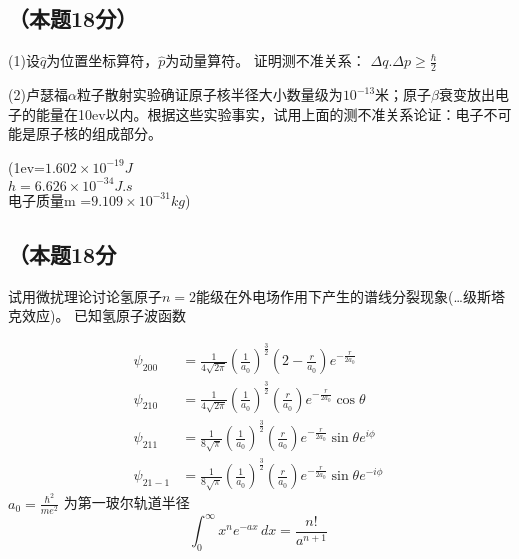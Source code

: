 \subsection{（本题18分）}
(1)设$\hat q$为位置坐标算符，$\hat p$为动量算符。
证明测不准关系：
$\Delta q.\Delta p\ge \frac{\hbar}{2}$

(2)卢瑟福$\alpha$粒子散射实验确证原子核半径大小数量级为$10^{-13}$米；原子$\beta$衰变放出电子的能量在10ev以内。根据这些实验事实，试用上面的测不准关系论证：电子不可能是原子核的组成部分。

(1ev=$1.602\times10^{-19}J$\\
$h=6.626\times10^{-34}J.s$\\
电子质量m =$9.109\times {10^{-31}kg}$)

\subsection{（本题18分}
试用微扰理论讨论氢原子$n=2$能级在外电场作用下产生的谱线分裂现象(…级斯塔克效应)。
已知氢原子波函数

\begin{equation}
\begin{aligned}
\psi_{200} &= \frac{1}{4\sqrt{2\pi}} \left( \frac{1}{a_0} \right)^{\frac{3}{2}} (2 - \frac{r}{a_0}) e^{-\frac{r}{2a_0}} \\
\psi_{210} &= \frac{1}{4\sqrt{2\pi}} \left( \frac{1}{a_0} \right)^{\frac{3}{2}} \left( \frac{r}{a_0} \right) e^{-\frac{r}{2a_0}} \cos \theta \\
\psi_{211} &= \frac{1}{8\sqrt{\pi}} \left( \frac{1}{a_0} \right)^{\frac{3}{2}} \left( \frac{r}{a_0} \right) e^{-\frac{r}{2a_0}} \sin \theta e^{i\phi} \\
\psi_{21-1} &= \frac{1}{8\sqrt{\pi}} \left( \frac{1}{a_0} \right)^{\frac{3}{2}} \left( \frac{r}{a_0} \right) e^{-\frac{r}{2a_0}} \sin \theta e^{-i\phi}
\end{aligned}~
\end{equation}
$ a_0 = \frac{\hbar^2}{me^2}$ 为第一玻尔轨道半径
\begin{equation}
\int_{0}^{\infty} x^n e^{-ax} \, dx = \frac{n!}{a^{n+1}}~
\end{equation}